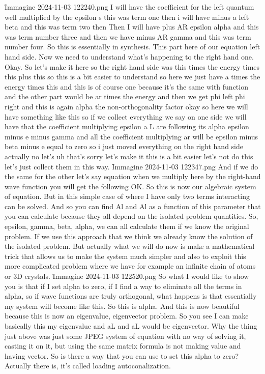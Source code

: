 \f{Immagine 2024-11-03 122240.png}
I will have the coefficient for the left quantum well multiplied by the epsilon s this was term one then i will have minus a left beta and this was term two then Then I will have plus AR epsilon alpha and this was term number three and then we have minus AR gamma and this was term number four. So this is essentially in synthesis. This part here of our equation left hand side. Now we need to understand what's happening to the right hand one. Okay. So let's make it here so the right hand side was this times the energy times this plus this so this is a bit easier to understand so here we just have a times the energy times this and this is of course one because it's the same with function and the other part would be ar times the energy and then we get phi left phi right and this is again alpha the non-orthogonality factor okay so here we will have something like this so if we collect everything we say on one side we will have that the coefficient multiplying epsilon a L are following its alpha epsilon minus e minus gamma and all the coefficient multiplying ar will be epsilon minus beta minus e equal to zero so i just moved everything on the right hand side actually no let's uh that's sorry let's make it this is a bit easier let's not do this let's just collect them in this way.
\f{Immagine 2024-11-03 122347.png}
And if we do the same for the other let's say equation when we multiply here by the right-hand wave function you will get the following OK. So this is now our algebraic system of equation. But in this simple case of where I have only two terms interacting can be solved. And so you can find Al and Al as a function of this parameter that you can calculate because they all depend on the isolated problem quantities. So, epsilon, gamma, beta, alpha, we can all calculate them if we know the original problem. If we use this approach that we think we already know the solution of the isolated problem. But actually what we will do now is make a mathematical trick that allows us to make the system much simpler and also to exploit this more complicated problem where we have for example an infinite chain of atoms or 3D crystals.
\f{Immagine 2024-11-03 122520.png}
So what I would like to show you is that if I set alpha to zero, if I find a way to eliminate all the terms in alpha, so if wave functions are truly orthogonal, what happens is that essentially my system will become like this. So this is alpha. And this is now beautiful because this is now an eigenvalue, eigenvector problem. So you see I can make basically this my eigenvalue and aL and aL would be eigenvector. Why the thing just above was just some JPEG system of equation with no way of solving it, casting it on it, but using the same matrix formula is not making value and having vector. So is there a way that you can use to set this alpha to zero? Actually there is, it's called loading autoconalization.
